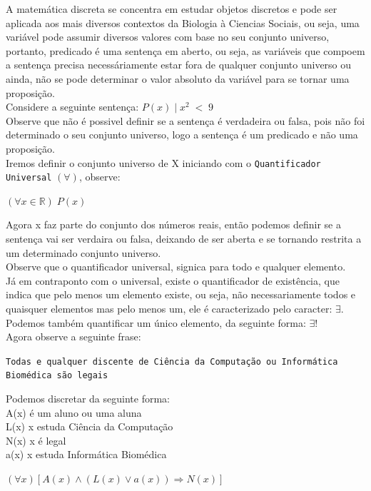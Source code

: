 \documentclass[12pt, onecolumn]{article}
\begin{document}
	A matemática discreta se concentra em estudar objetos discretos e pode
	ser aplicada aos mais diversos contextos da Biologia à Ciencias Sociais, ou
	seja, uma variável pode assumir diversos valores com base no seu conjunto
	universo, portanto, predicado é uma sentença em aberto, ou seja, 
	as variáveis que compoem a sentença precisa necessáriamente estar fora de 
	qualquer conjunto universo ou ainda, não se pode determinar o valor absoluto 
	da variável para se tornar uma proposição. \\
	\newline
	Considere a seguinte sentença: $P(x)\;|\;x^2\;<\;9$ \\
	\newline
	Observe que não é possivel definir se a sentença é verdadeira ou falsa, 
	pois não foi determinado o seu conjunto universo, logo a sentença é um 
	predicado e não uma proposição. \\
	\newline
	Iremos definir o conjunto universo de X iniciando com o \texttt{Quantificador
	Universal} $(\forall)$, observe:
	\begin{center}
		$(\forall x \in \mathbb{R}) \; P(x)$	
	\end{center}
	Agora x faz parte do conjunto dos números reais, então podemos definir
	se a sentença vai ser verdaira ou falsa, deixando de ser aberta e se tornando
	restrita a um determinado conjunto universo. \\
	Observe que o quantificador universal, signica para todo e qualquer elemento. \\
	\newline
	Já em contraponto com o universal, existe o quantificador de existência, 
	que indica que pelo menos um elemento existe, ou seja, não necessariamente 
	todos e quaisquer elementos mas pelo menos um, ele é caracterizado pelo 
	caracter: $\exists$. \\
	\newline
	Podemos também quantificar um único elemento, da seguinte forma: $\exists!$ \\
	\newline
	Agora observe a seguinte frase:
	\begin{center}
		\texttt{Todas e qualquer discente de Ciência da Computação ou 
		Informática Biomédica são legais}
	\end{center}
	Podemos discretar da seguinte forma:  \\
	\newline
	A(x) é um aluno ou uma aluna \\
	L(x) x estuda Ciência da Computação \\ 
	N(x) x é legal \\
	a(x) x estuda Informática Biomédica
	\begin{center}
		$(\forall x)[A(x) \land (L(x)  \lor a(x)) \Rightarrow N(x)]$
	\end{center}
\end{document}
